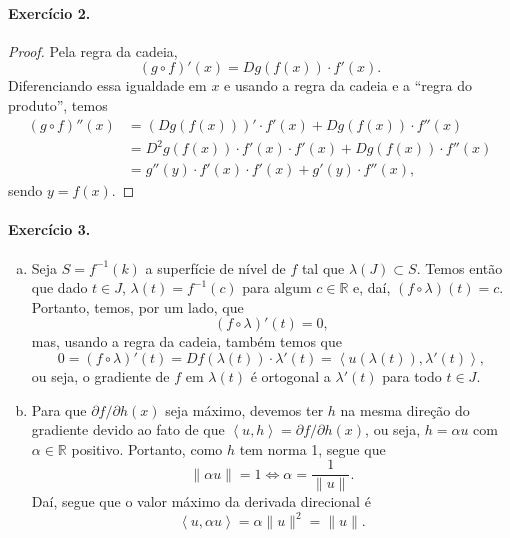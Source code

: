 \documentclass[12pt,a4paper]{article}
\newcommand{\R}{\mathbb{R}}
\begin{document}
\paragraph{Exercício 2.}
    \begin{proof}
        Pela regra da cadeia,
        \begin{equation*}
            (g\circ f)'(x) = Dg(f(x))\cdot f'(x).
        \end{equation*}
        Diferenciando essa igualdade em $x$ e usando a regra da cadeia e a ``regra do produto'', temos
        \begin{align*}
            (g\circ f)''(x) &= (Dg(f(x)))'\cdot f'(x) + Dg(f(x))\cdot f''(x) \\
                            &= D^2g(f(x))\cdot f'(x)\cdot f'(x) + Dg(f(x))\cdot f''(x) \\
                            &= g''(y)\cdot f'(x)\cdot f'(x) + g'(y)\cdot f''(x),
        \end{align*}
        sendo $y=f(x)$.
    \end{proof}
\paragraph{Exercício 3.}
%
    \begin{enumerate}[a)]
        \item Seja $S = f^{-1}(k)$ a superfície de nível de $f$ tal que $\lambda(J)\subset S$. Temos
        então que dado $t\in J$, $\lambda(t) = f^{-1}(c)$ para algum $c\in\R$ e, daí, $(f\circ\lambda)(t) = c$.
        Portanto, temos, por um lado, que
        \begin{equation*}
            (f\circ \lambda)'(t) = 0,
        \end{equation*}
        mas, usando a regra da cadeia, também temos que
        \begin{equation*}
            0 = (f\circ \lambda)'(t) = Df(\lambda(t))\cdot\lambda'(t) 
                                     = \left\langle u(\lambda(t)), \lambda'(t) \right\rangle,
        \end{equation*}
        ou seja, o gradiente de $f$ em $\lambda(t)$ é ortogonal a $\lambda'(t)$ para todo $t\in J$.
        \item Para que $\partial f/\partial h (x)$ seja máximo, devemos ter $h$ na mesma direção do
        gradiente devido ao fato de que $\left\langle u,h \right\rangle = \partial f/\partial h (x)$,
        ou seja, $h = \alpha u$ com $\alpha\in\R$ positivo. Portanto, como $h$ tem norma 1, segue que
        \begin{equation*}
            \|\alpha u\| = 1 \iff \alpha = \frac{1}{\|u\|}.
        \end{equation*}
        Daí, segue que o valor máximo da derivada direcional é
        \begin{equation*}
            \left\langle u, \alpha u \right\rangle = \alpha \|u\|^2 = \|u\|.
        \end{equation*}
    \end{enumerate}
%
\end{document}

